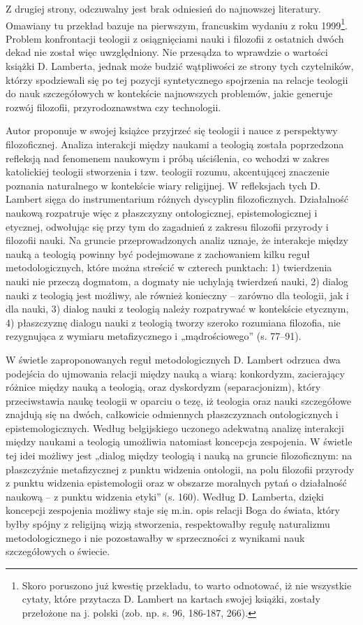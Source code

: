 \documentclass[a4paper]{article}
\begin{document}
Z drugiej strony, odczuwalny jest brak odniesień do najnowszej literatury. Omawiany tu przekład bazuje na pierwszym,
francuskim wydaniu z roku 1999\footnote{ Skoro poruszono już kwestię przekładu, to warto odnotować, iż nie wszystkie
cytaty, które przytacza D. Lambert na kartach swojej książki, zostały przełożone na j. polski (zob. np. s. 96, 186-187,
266). }. Problem konfrontacji teologii z osiągnięciami nauki i filozofii z ostatnich dwóch dekad nie został więc
uwzględniony. Nie przesądza to wprawdzie o wartości książki D. Lamberta, jednak może budzić wątpliwości ze strony tych
czytelników, którzy spodziewali się po tej pozycji syntetycznego spojrzenia na relacje teologii do nauk szczegółowych w
kontekście najnowszych problemów, jakie generuje rozwój filozofii, przyrodoznawstwa czy technologii. 

Autor proponuje w swojej książce przyjrzeć się teologii i nauce z perspektywy filozoficznej. Analiza interakcji między
naukami a teologią została poprzedzona refleksją nad fenomenem naukowym i próbą uściślenia, co wchodzi w zakres
katolickiej teologii stworzenia i tzw. teologii rozumu, akcentującej znaczenie poznania naturalnego w kontekście wiary
religijnej. W refleksjach tych D. Lambert sięga do instrumentarium różnych dyscyplin filozoficznych. Działalność
naukową rozpatruje więc z płaszczyzny ontologicznej, epistemologicznej i etycznej, odwołując się przy tym do zagadnień
z zakresu filozofii przyrody i filozofii nauki. Na gruncie przeprowadzonych analiz uznaje, że interakcje między nauką a
teologią powinny być podejmowane z zachowaniem kilku reguł metodologicznych, które można streścić w czterech punktach:
1) twierdzenia nauki nie przeczą dogmatom, a dogmaty nie uchylają twierdzeń nauki, 2) dialog nauki z teologią jest
możliwy, ale również konieczny – zarówno dla teologii, jak i dla nauki, 3) dialog nauki z teologią należy rozpatrywać w
kontekście etycznym, 4) płaszczyznę dialogu nauki z teologią tworzy szeroko rozumiana filozofia, nie rezygnująca z
wymiaru metafizycznego i „mądrościowego” (s. 77–91).

W świetle zaproponowanych reguł metodologicznych D. Lambert odrzuca dwa podejścia do ujmowania relacji między nauką a
wiarą: konkordyzm, zacierający różnice między nauką a teologią, oraz dyskordyzm (separacjonizm), który przeciwstawia
naukę teologii w oparciu o tezę, iż teologia oraz nauki szczegółowe znajdują się na dwóch, całkowicie odmiennych
płaszczyznach ontologicznych i epistemologicznych. Według belgijskiego uczonego adekwatną analizę interakcji między
naukami a teologią umożliwia natomiast koncepcja zespojenia. W świetle tej idei możliwy jest „dialog między teologią i
nauką na gruncie filozoficznym: na płaszczyźnie metafizycznej z punktu widzenia ontologii, na polu filozofii przyrody z
punktu widzenia epistemologii oraz w obszarze moralnych pytań o działalność naukową – z punktu widzenia etyki” (s.
160). Według D. Lamberta, dzięki koncepcji zespojenia możliwy staje się m.in. opis relacji Boga do świata, który byłby
spójny z religijną wizją stworzenia, respektowałby regułę naturalizmu metodologicznego i nie pozostawałby w
sprzeczności z wynikami nauk szczegółowych o świecie. 
\end{document}
